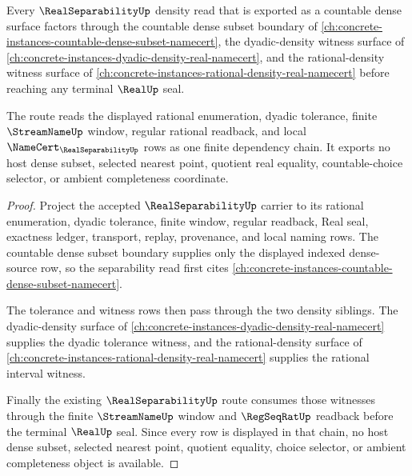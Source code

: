 \begin{lemma}
\label{lem:real-separability-countable-dense-route}
Every $\RealSeparabilityUp$ density read that is exported as a countable dense surface factors through the countable dense subset boundary of \autoref{ch:concrete-instances-countable-dense-subset-namecert}, the dyadic-density witness surface of \autoref{ch:concrete-instances-dyadic-density-real-namecert}, and the rational-density witness surface of \autoref{ch:concrete-instances-rational-density-real-namecert} before reaching any terminal $\RealUp$ seal.

The route reads the displayed rational enumeration, dyadic tolerance, finite $\StreamNameUp$ window, regular rational readback, and local $\NameCert_{\RealSeparabilityUp}$ rows as one finite dependency chain. It exports no host dense subset, selected nearest point, quotient real equality, countable-choice selector, or ambient completeness coordinate.
\end{lemma}
\begin{proof}
Project the accepted $\RealSeparabilityUp$ carrier to its rational enumeration, dyadic tolerance, finite window, regular readback, Real seal, exactness ledger, transport, replay, provenance, and local naming rows. The countable dense subset boundary supplies only the displayed indexed dense-source row, so the separability read first cites \autoref{ch:concrete-instances-countable-dense-subset-namecert}.

The tolerance and witness rows then pass through the two density siblings. The dyadic-density surface of \autoref{ch:concrete-instances-dyadic-density-real-namecert} supplies the dyadic tolerance witness, and the rational-density surface of \autoref{ch:concrete-instances-rational-density-real-namecert} supplies the rational interval witness.

Finally the existing $\RealSeparabilityUp$ route consumes those witnesses through the finite $\StreamNameUp$ window and $\RegSeqRatUp$ readback before the terminal $\RealUp$ seal. Since every row is displayed in that chain, no host dense subset, selected nearest point, quotient equality, choice selector, or ambient completeness object is available.
\end{proof}
